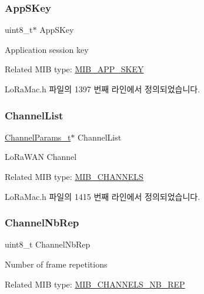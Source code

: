 \subsubsection{\texorpdfstring{App\+S\+Key}{AppSKey}}
{\footnotesize\ttfamily uint8\+\_\+t$\ast$ App\+S\+Key}

Application session key

Related M\+IB type\+: \mbox{\hyperlink{group___l_o_r_a_m_a_c_gga32ea83d13a3f5bb4b3ec2ace2319ab61ae65b7c035d9969666eb5e26a2b3c19fd}{M\+I\+B\+\_\+\+A\+P\+P\+\_\+\+S\+K\+EY}} 

Lo\+Ra\+Mac.\+h 파일의 1397 번째 라인에서 정의되었습니다.

\mbox{\label{unionu_mib_param_ad8f366dd9087f9cdaa4f7021f2d6e2b9}} 
\subsubsection{\texorpdfstring{Channel\+List}{ChannelList}}
{\footnotesize\ttfamily \mbox{\hyperlink{group___l_o_r_a_m_a_c_ga1360ca6f82c6d125ea43a9dad9b56184}{Channel\+Params\+\_\+t}}$\ast$ Channel\+List}

Lo\+Ra\+W\+AN Channel

Related M\+IB type\+: \mbox{\hyperlink{group___l_o_r_a_m_a_c_gga32ea83d13a3f5bb4b3ec2ace2319ab61a0236aae7748c12308383eab208a3cc5a}{M\+I\+B\+\_\+\+C\+H\+A\+N\+N\+E\+LS}} 

Lo\+Ra\+Mac.\+h 파일의 1415 번째 라인에서 정의되었습니다.

\mbox{\label{unionu_mib_param_ab2d109f5c6312dc56dfc9842bb6f141b}} 
\subsubsection{\texorpdfstring{Channel\+Nb\+Rep}{ChannelNbRep}}
{\footnotesize\ttfamily uint8\+\_\+t Channel\+Nb\+Rep}

Number of frame repetitions

Related M\+IB type\+: \mbox{\hyperlink{group___l_o_r_a_m_a_c_gga32ea83d13a3f5bb4b3ec2ace2319ab61af8775ceffd8bc73429e43eac205383ea}{M\+I\+B\+\_\+\+C\+H\+A\+N\+N\+E\+L\+S\+\_\+\+N\+B\+\_\+\+R\+EP}} 

